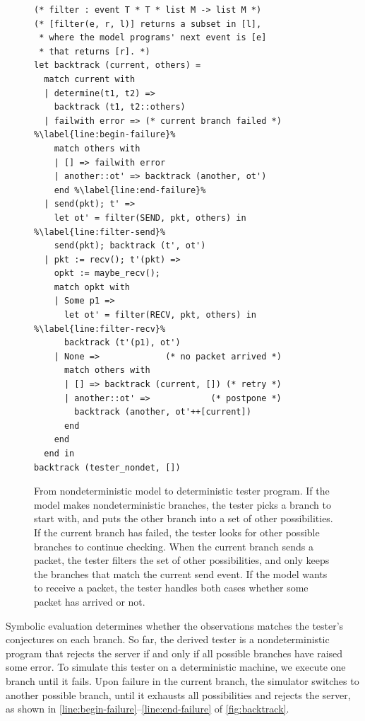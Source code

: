 \begin{figure}
  \begin{lstlisting}[style=customcoq,escapechar=\%]
(* filter : event T * T * list M -> list M *)
(* [filter(e, r, l)] returns a subset in [l],
 * where the model programs' next event is [e]
 * that returns [r]. *)
let backtrack (current, others) =
  match current with
  | determine(t1, t2) =>
    backtrack (t1, t2::others)
  | failwith error => (* current branch failed *) %\label{line:begin-failure}%
    match others with
    | [] => failwith error
    | another::ot' => backtrack (another, ot')
    end %\label{line:end-failure}%
  | send(pkt); t' =>
    let ot' = filter(SEND, pkt, others) in %\label{line:filter-send}%
    send(pkt); backtrack (t', ot')
  | pkt := recv(); t'(pkt) =>
    opkt := maybe_recv();
    match opkt with
    | Some p1 =>
      let ot' = filter(RECV, pkt, others) in %\label{line:filter-recv}%
      backtrack (t'(p1), ot')
    | None =>             (* no packet arrived *)
      match others with
      | [] => backtrack (current, []) (* retry *)
      | another::ot' =>            (* postpone *)
        backtrack (another, ot'++[current])
      end
    end
  end in
backtrack (tester_nondet, [])
  \end{lstlisting}
  \caption{From nondeterministic model to deterministic tester program.  If the
    model makes nondeterministic branches, the tester picks a branch to start
    with, and puts the other branch into a set of other possibilities.  If the
    current branch has failed, the tester looks for other possible branches to
    continue checking.  When the current branch sends a packet, the tester
    filters the set of other possibilities, and only keeps the branches that
    match the current send event.  If the model wants to receive a packet, the
    tester handles both cases whether some packet has arrived or not.}
  \label{fig:backtrack}
\end{figure}

Symbolic evaluation determines whether the observations matches the tester's
conjectures on each branch.  So far, the derived tester
is a nondeterministic program that rejects the server if and only if all
possible branches have raised some error.  To simulate this tester on a
deterministic machine, we execute one branch until it fails.  Upon failure in
the current branch, the simulator switches to another possible branch, until it
exhausts all possibilities and rejects the server, as shown in
\autoref{line:begin-failure}--\ref{line:end-failure} of
\autoref{fig:backtrack}.

